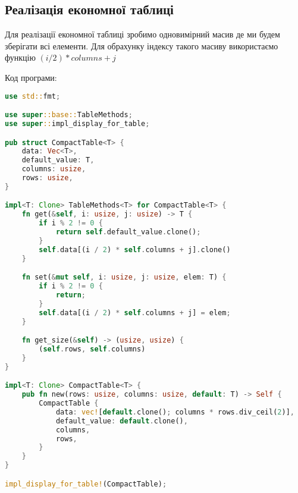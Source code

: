 \newpage
\subsection{Реалізація економної таблиці}
Для реалізації економної таблиці зробимо одновимірний масив де ми будем зберігати всі елементи.
Для обрахунку індексу такого масиву використаємо функцію $(i / 2) * columns + j$

\noindent
Код програми:
\begin{lstlisting}[language=Rust, style=colouredRust]
use std::fmt;

use super::base::TableMethods;
use super::impl_display_for_table;

pub struct CompactTable<T> {
    data: Vec<T>,
    default_value: T,
    columns: usize,
    rows: usize,
}

impl<T: Clone> TableMethods<T> for CompactTable<T> {
    fn get(&self, i: usize, j: usize) -> T {
        if i % 2 != 0 {
            return self.default_value.clone();
        }
        self.data[(i / 2) * self.columns + j].clone()
    }

    fn set(&mut self, i: usize, j: usize, elem: T) {
        if i % 2 != 0 {
            return;
        }
        self.data[(i / 2) * self.columns + j] = elem;
    }

    fn get_size(&self) -> (usize, usize) {
        (self.rows, self.columns)
    }
}

impl<T: Clone> CompactTable<T> {
    pub fn new(rows: usize, columns: usize, default: T) -> Self {
        CompactTable {
            data: vec![default.clone(); columns * rows.div_ceil(2)],
            default_value: default.clone(),
            columns,
            rows,
        }
    }
}

impl_display_for_table!(CompactTable);
\end{lstlisting}



\newpage
